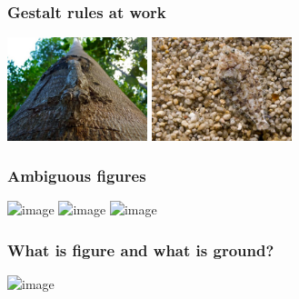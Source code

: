\documentclass[]{beamer}
\begin{document}
\begin{frame}
 \frametitle{Gestalt rules at work}
\begin{center}
\includegraphics[height=30mm]{figs/l5/camouflage_similarity.jpg}
\includegraphics[height=30mm]{figs/l5/camouflage_similarity2.jpg}
\end{center}
\end{frame}



\begin{frame}
 \frametitle{Ambiguous figures}

\begin{center}
\includegraphics<1>[width=70mm]{figs/l5/duck_rabbit.png}
\includegraphics<2>[width=70mm]{figs/l5/necker_cube.png}
\includegraphics<3>[width=80mm]{figs/l5/accidental_viewpoint.png}
\end{center}
\end{frame}

\begin{frame}
 \frametitle{What is figure and what is ground?}
\begin{center}
\includegraphics<1>[width=40mm]{figs/l5/figure_ground.png}
\end{center}

\end{frame}
\end{document}
